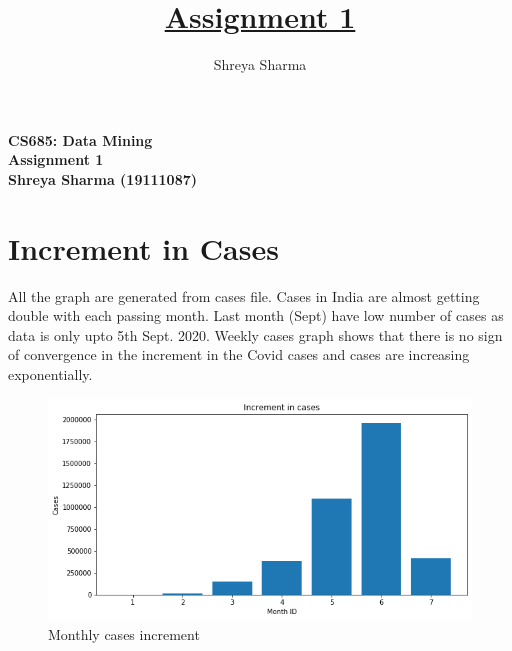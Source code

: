 \documentclass[12pt]{article}
\title{\underline{Assignment 1} \\}
\author{Shreya Sharma}
\begin{document}


\begin{center}
    
\vspace{1 cm}

\textbf{\Large{CS685: Data Mining} \\ \vspace{0.5 cm}\Large{Assignment 1} \\\vspace{0.5 cm}\Large{Shreya Sharma (19111087)}}\\
\vspace{1 cm} 
\end{center}
\section{Increment in Cases}
All the graph are generated from cases file. Cases in India are almost getting double with each passing month. Last month (Sept) have low number of cases as data is only upto 5th Sept. 2020. Weekly cases graph shows that there is no sign of convergence in the increment in the Covid cases and cases are increasing exponentially.
\begin{figure}[h!]
\centering
\includegraphics[scale=.4]{monthly-cases}
\caption{Monthly cases increment}
\end{figure}
\end{document}

